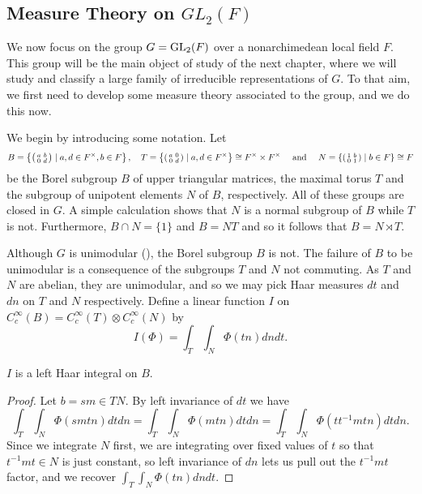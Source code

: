 \subsection{Measure Theory on \texorpdfstring{$GL_2(F)$}{TEXT}}\label{sec:measuregl2}

We now focus on the group $G=\mathrm{GL}_2(F)$ over a nonarchimedean local field $F$. This group will be the main object of study of the next chapter, where we will study and classify a large family of irreducible representations of $G$. To that aim, we first need to develop some measure theory associated to the group, and we do this now.

We begin by introducing some notation. Let $$B=\left\{\begin{psmallmatrix} a&b\\0&d\end{psmallmatrix} \mid a,d \in F^\times, b \in F\right\},\quad T=\left\{\begin{psmallmatrix}
    a&0\\0&d
\end{psmallmatrix}\mid a,d \in F^\times\right\} \cong F^\times \times F^\times\quad\text{ and }\quad N=\left\{\begin{psmallmatrix}
    1&b\\0&1
\end{psmallmatrix}\mid b \in F\right\}\cong F$$ be the Borel subgroup $B$ of upper triangular matrices, the maximal torus $T$ and the subgroup of unipotent elements $N$ of $B$, respectively. All of these groups are closed in $G$. A simple calculation shows that $N$ is a normal subgroup of $B$ while $T$ is not. Furthermore, $B\cap N=\{1\}$ and $B=NT$ and so it follows that $B=N \rtimes T$.

Although $G$ is unimodular (\cite[Proposition 7.5]{BH1}), the Borel subgroup $B$ is not. The failure of $B$ to be unimodular is a consequence of the subgroups $T$ and $N$ not commuting. As $T$ and $N$ are abelian, they are unimodular, and so we may pick Haar measures $dt$ and $dn$ on $T$ and $N$ respectively. Define a linear function $I$ on $C_c^\infty(B) = C_c^\infty(T) \otimes C_c^\infty(N)$ by
$$I(\Phi) = \int_T\int_N \Phi(tn) dn dt.$$

\begin{prop}
    $I$ is a left Haar integral on $B$.
\end{prop}
\begin{proof}
    Let $b=sm \in TN$. By left invariance of $dt$ we have
    $$\int_T\int_N \Phi(smtn)dtdn = \int_T\int_N \Phi(mtn)dtdn = \int_T\int_N \Phi(tt^{-1}mtn)dtdn.$$
    Since we integrate $N$ first, we are integrating over fixed values of $t$ so that $t^{-1}mt \in N$ is just constant, so left invariance of $dn$ lets us pull out the $t^{-1}mt$ factor, and we recover $\int_T\int_N \Phi(tn) dn dt$.
\end{proof}

